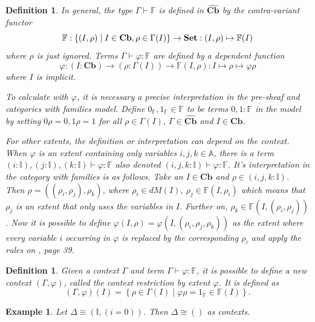 \documentclass[12pt,a4paper,twoside,xetex]{book} %
\newcommand{\keyword}[1]{\emph{#1}\index{#1}}
\newtheorem{definition}[theorem]{Definition}
\newtheorem{example}[theorem]{Example}
\newcommand{\psh}[1]{\widehat{#1}}
\newcommand{\cube}[0]{\textbf{Cb}}
\begin{document}
\begin{definition}
In general, the type $\Gamma \vdash \mathbb{F}$ is defined in $\psh{\cube}$ by the contra-variant functor $$\mathbb{F} : \left\{ (I, \rho) \mid  I \in 
\cube,  \rho \in \Gamma (I) \right\} \rightarrow \set: (I, \rho) \mapsto 
\mathbb{F}(I)$$ where $\rho$ is just ignored. Terms $\Gamma \vdash \varphi : 
\mathbb{F}$ are defined by a dependent function $$\varphi : (I : \cube) 
\rightarrow (\rho : \Gamma (I)) \rightarrow  \mathbb{F}(I,\rho): I \mapsto \rho 
\mapsto \varphi \rho $$ where $I$ is implicit.

To calculate with $\varphi$, it is necessary a precise interpretation in the 
pre-sheaf and categories with families model. Define $ 0_{\mathbb{F}}, 
1_{\mathbb{F}} \in \mathbb{F}$ to be terms $0,1 : \mathbb{F}$ in the model by 
setting \(0 \rho = 0, 1 \rho = 1\) for all $\rho \in \Gamma (I)$, $\Gamma \in 
\psh{\cube}$ and $I \in \cube$.  

For other extents, the definition or interpretation can depend on the context. 
When $\varphi$ is an extent containing only variables $i,j,k \in \mathbb{A}$, 
there is a term $(i: \mathbb{I}), (j: \mathbb{I}), (k: \mathbb{I}) \vdash 
\varphi : \mathbb{F}$ also denoted $(i,j,k: \mathbb{I}) \vdash \varphi : 
\mathbb{F}$. It's interpretation in the category with families is as follows. 
Take an $I \in \cube$ and  $\rho \in (i,j,k: \mathbb{I})$. Then $\rho = 
((\rho_i, \rho_j), \rho_k)$, where $\rho_i \in dM(I)$, $\rho_j \in 
\mathbb{F}(I,\rho_i)$ which means that $\rho_j$ is an extent that only uses the 
variables in $I$. Further on, $\rho_k \in \mathbb{F}(I, (\rho_i, \rho_j))$. Now 
it is possible to define $\varphi(I,\rho)=\varphi(I,(\rho_i,\rho_j,\rho_k))$ as 
the extent where every variable $i$ occurring in $\varphi$ is replaced by the 
corresponding $\rho_i$ and apply the rules on \cite{Orton2019}, page 39.
\end{definition}



\begin{definition}\label{contextrestriction}
Given a context $\Gamma$ and term $\Gamma \vdash \varphi : \mathbb{F}$, it is 
possible to define a new context $(\Gamma , \varphi)$, called the 
\keyword{context restriction by extent $\varphi$}. It is defined as  $$(\Gamma 
, \varphi)(I) = \left\{ \rho \in \Gamma (I) \mid \varphi \rho = 1_{\mathbb{F}} 
\in \mathbb{F}(I) \right \} .$$
\end{definition}
 
\begin{example}
Let $\Delta \equiv (\mathbb{I}, (i=0))$. Then 
$\Delta \cong ()$ as contexts.
\end{example} 
\end{document}
